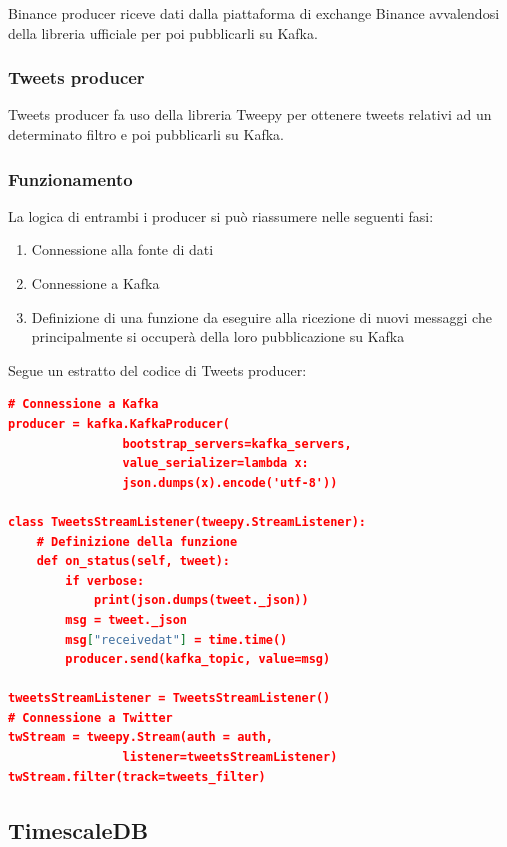 Binance producer riceve dati dalla piattaforma di exchange Binance \cite{binance}
avvalendosi della libreria ufficiale per poi pubblicarli su Kafka.

\subsubsection{Tweets producer}

Tweets producer fa uso della libreria Tweepy \cite{tweepy} per ottenere tweets relativi
ad un determinato filtro e poi pubblicarli su Kafka.

\subsubsection{Funzionamento}
La logica di entrambi i producer si può riassumere nelle seguenti fasi:
\begin{enumerate}
    \item Connessione alla fonte di dati
    \item Connessione a Kafka
    \item Definizione di una funzione da eseguire alla ricezione di nuovi messaggi che
          principalmente si occuperà della loro pubblicazione su Kafka
\end{enumerate}

Segue un estratto del codice di Tweets producer:

\begin{lstlisting}[language=json,firstnumber=1]
# Connessione a Kafka
producer = kafka.KafkaProducer(
                bootstrap_servers=kafka_servers,
                value_serializer=lambda x: 
                json.dumps(x).encode('utf-8'))

class TweetsStreamListener(tweepy.StreamListener):
    # Definizione della funzione
    def on_status(self, tweet):
        if verbose:
            print(json.dumps(tweet._json))
        msg = tweet._json
        msg["receivedat"] = time.time()
        producer.send(kafka_topic, value=msg)

tweetsStreamListener = TweetsStreamListener()
# Connessione a Twitter
twStream = tweepy.Stream(auth = auth,
                listener=tweetsStreamListener)
twStream.filter(track=tweets_filter)
\end{lstlisting}

\subsection{TimescaleDB}

